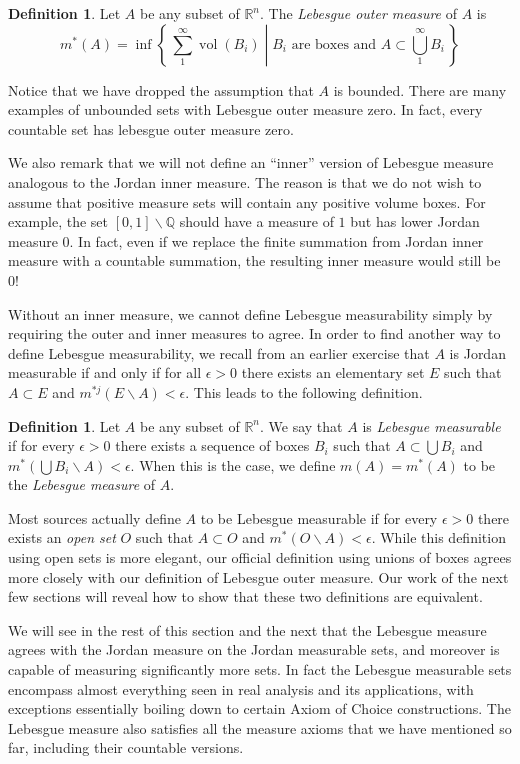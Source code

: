 \documentclass[10pt,oneside]{amsbook}
\newcommand{\set}[1]{\left\{\,#1\,\right\}}
\renewcommand{\setminus}{\smallsetminus}
\newcommand{\QQ}{{\mathbb Q}}
\newcommand{\RR}{{\mathbb R}}
\DeclareMathOperator{\vol}{vol}
\theoremstyle{definition}
\theoremstyle{plain}
\theoremstyle{definition}
\newtheorem{defn}[thm]{Definition}
\theoremstyle{remark}
\numberwithin{equation}{section}
\numberwithin{figure}{section}
\begin{document}
\begin{defn}
  Let $A$ be any subset of $\RR^n$. The \emph{Lebesgue outer measure} of $A$ is
  \[m^*(A)=\inf\set{\left.\sum_1^\infty \vol(B_i)\;\right|\;\text{$B_i$ are boxes and }A\subset\bigcup_1^\infty B_i}
  \]
\end{defn}

Notice that we have dropped the assumption that $A$ is bounded. There are many examples of unbounded sets with Lebesgue outer measure zero. In fact, every countable set has lebesgue outer measure zero.

We also remark that we will not define an ``inner'' version of Lebesgue measure analogous to the Jordan inner measure. The reason is that we do not wish to assume that positive measure sets will contain any positive volume boxes. For example, the set $[0,1]\setminus\QQ$ should have a measure of $1$ but has lower Jordan measure $0$. In fact, even if we replace the finite summation from Jordan inner measure with a countable summation, the resulting inner measure would still be $0$!

Without an inner measure, we cannot define Lebesgue measurability simply by requiring the outer and inner measures to agree. In order to find another way to define Lebesgue measurability, we recall from an earlier exercise that $A$ is Jordan measurable if and only if for all $\epsilon>0$ there exists an elementary set $E$ such that $A\subset E$ and $m^{*j}(E\setminus A)<\epsilon$. This leads to the following definition.

\begin{defn}
  Let $A$ be any subset of $\RR^n$. We say that $A$ is \emph{Lebesgue measurable} if for every $\epsilon>0$ there exists a sequence of boxes $B_i$ such that $A\subset\bigcup B_i$ and $m^*(\bigcup B_i\setminus A)<\epsilon$. When this is the case, we define $m(A)=m^*(A)$ to be the \emph{Lebesgue measure} of $A$.
\end{defn}

Most sources actually define $A$ to be Lebesgue measurable if for every $\epsilon>0$ there exists an \emph{open set} $O$ such that $A\subset O$ and $m^*(O\setminus A)<\epsilon$. While this definition using open sets is more elegant, our official definition using unions of boxes agrees more closely with our definition of Lebesgue outer measure. Our work of the next few sections will reveal how to show that these two definitions are equivalent.

We will see in the rest of this section and the next that the Lebesgue measure agrees with the Jordan measure on the Jordan measurable sets, and moreover is capable of measuring significantly more sets. In fact the Lebesgue measurable sets encompass almost everything seen in real analysis and its applications, with exceptions essentially boiling down to certain Axiom of Choice constructions. The Lebesgue measure also satisfies all the measure axioms that we have mentioned so far, including their countable versions.
\end{document}
